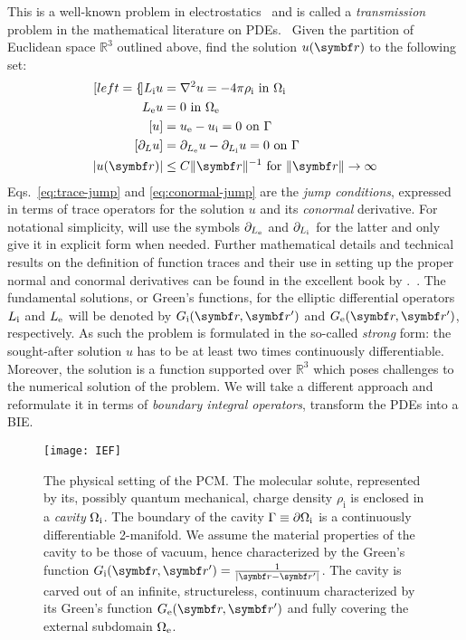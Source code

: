 This is a well-known problem in electrostatics~\autocite{Jackson1999, Vanderlinde2005-gf}
and is called a \emph{transmission} problem in the mathematical
literature on \acp{PDE}.~\autocite{Hackbusch1995-uq, Sauter2011-an}
Given the partition of Euclidean space $\mathbb{R}^3$ outlined above,
find the solution $u(\vect{r})$ to the following set:
\begin{subequations}\label{eq:transmission}
  \begin{align}[left={\empheqlbrace}]
  \Li u &= \nabla^2 u = -4\pi\rhoi \,\, \text{in}\,\, \Omegai \label{eq:internal} \\
  \Le u &= 0 \,\, \text{in}\,\, \Omegae \label{eq:external} \\
  [u] &= \ue - \ui = 0 \,\, \text{on}\,\, \Gamma
  \label{eq:trace-jump} \\
[\partial_L u] &= \partiale u - \partiali u = 0 \,\, \text{on}\,\, \Gamma \label{eq:conormal-jump} \\
|u(\vect{r})| &\leq C \|\vect{r} \|^{-1} \,\,\text{for}\,\,\| \vect{r} \|\rightarrow\infty
\label{eq:radiation}
\end{align}
\end{subequations}
Eqs.~\eqref{eq:trace-jump} and \eqref{eq:conormal-jump}
are the \emph{jump conditions}, expressed in terms of trace operators
for the solution $u$ and its \emph{conormal} derivative.
For notational simplicity, will use the symbols $\partial_{L_\mathrm{e}}$ and $\partial_{L_\mathrm{i}}$
for the latter and only give it in explicit form when needed.
Further mathematical details and technical results on the definition of
function traces and their use in setting up the proper normal and
conormal derivatives can be found in the excellent book by
\citeauthor{Sauter2011-an}.~\autocite{Sauter2011-an}.
The fundamental solutions, or Green's functions, for the elliptic
differential operators $L_\mathrm{i}$ and $L_\mathrm{e}$ will be denoted by $\Gi$ and
$\Ge$, respectively.
As such the problem is formulated in the so-called \emph{strong} form:
the sought-after solution $u$ has to be at least two times continuously
differentiable.
Moreover, the solution is a function supported over $\mathbb{R}^3$ which
poses challenges to the numerical solution of the problem.
We will take a different approach and reformulate it in terms of
\emph{boundary integral operators}, \ie transform the \acsp{PDE} into a
\gls{BIE}.

\begin{figure}[tb]
  \centering
  \texttt{[image: IEF]}
  \caption[The physical setting of the polarizable continuum model.]{
  The physical setting of the \gls{PCM}. The molecular solute,
  represented by its, possibly quantum mechanical, charge density
  $\rho_\mathrm{i}$ is enclosed in a \emph{cavity} $\Omega_\mathrm{i}$.
  The boundary of the cavity $\Gamma\equiv\partial\Omega_\mathrm{i}$ is a
  continuously differentiable 2-manifold.
  We assume the material properties of the cavity to be those of vacuum,
  hence characterized by the Green's function
  $\Gi=\frac{1}{|\vect{r}-\vect{r}^\prime|}$.
  The cavity is carved out of an infinite, structureless, continuum
  characterized by its Green's function $\Ge$ and fully covering the
  external subdomain $\Omega_\mathrm{e}$.
  }
  \label{fig:IEF}
\end{figure}

